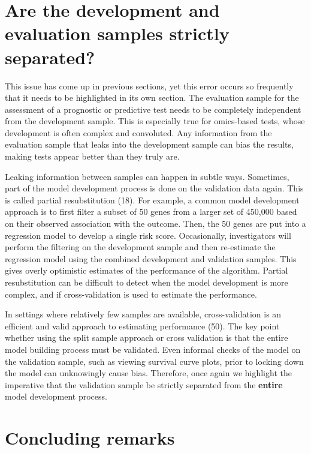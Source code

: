 \documentclass[11pt]{article}
\begin{document}
\section{Are the development and evaluation samples strictly
separated?}\label{are-the-development-and-evaluation-samples-strictly-separated}

This issue has come up in previous sections, yet this error occurs so
frequently that it needs to be highlighted in its own section. The
evaluation sample for the assessment of a prognostic or predictive test
needs to be completely independent from the development sample. This is
especially true for omics-based tests, whose development is often
complex and convoluted. Any information from the evaluation sample that
leaks into the development sample can bias the results, making tests
appear better than they truly are.

Leaking information between samples can happen in subtle ways.
Sometimes, part of the model development process is done on the
validation data again. This is called partial resubstitution (18). For
example, a common model development approach is to first filter a subset
of 50 genes from a larger set of 450,000 based on their observed
association with the outcome. Then, the 50 genes are put into a
regression model to develop a single risk score. Occasionally,
investigators will perform the filtering on the development sample and
then re-estimate the regression model using the combined development and
validation samples. This gives overly optimistic estimates of the
performance of the algorithm. Partial resubstitution can be difficult to
detect when the model development is more complex, and if
cross-validation is used to estimate the performance.

In settings where relatively few samples are available, cross-validation
is an efficient and valid approach to estimating performance (50). The
key point whether using the split sample approach or cross validation is
that the entire model building process must be validated. Even informal
checks of the model on the validation sample, such as viewing survival
curve plots, prior to locking down the model can unknowingly cause bias.
Therefore, once again we highlight the imperative that the validation
sample be strictly separated from the \textbf{entire} model development
process.

\section{Concluding remarks}\label{concluding-remarks}
\end{document}
